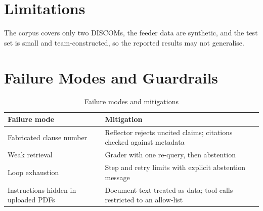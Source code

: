 \documentclass[12pt,a4paper,oneside]{report}
\newif\ifguidance
\newcommand{\guide}[1]{%
  \ifguidance
  \begin{tcolorbox}[enhanced,breakable,colback=guidebg,colframe=bmsblue,
    boxrule=0.6pt,arc=2pt,left=6pt,right=6pt,top=4pt,bottom=4pt,
    fonttitle=\bfseries\small,title={What to write here},
    before upper={\small\setstretch{1.1}}]
  #1
  \end{tcolorbox}
  \fi}
\newcommand{\dodont}[2]{%
  \ifguidance
  \begin{tcolorbox}[enhanced,breakable,sidebyside,sidebyside align=top seam,
    colback=dobg,colbacklower=dontbg,colframe=gray!60,boxrule=0.5pt,arc=2pt,
    lefthand ratio=0.5,left=5pt,right=5pt,top=4pt,bottom=4pt,
    fontupper=\small\setstretch{1.05},fontlower=\small\setstretch{1.05}]
  \textbf{\textcolor{ForestGreen}{\checkmark\ Do}}
  \begin{itemize}[leftmargin=12pt,itemsep=1pt,topsep=2pt]#1\end{itemize}
  \tcblower
  \textbf{\textcolor{BrickRed}{$\times$ Don't}}
  \begin{itemize}[leftmargin=12pt,itemsep=1pt,topsep=2pt]#2\end{itemize}
  \end{tcolorbox}
  \fi}
\newenvironment{sample}
  {\par\noindent{\footnotesize\bfseries\textcolor{BrickRed}{[SAMPLE --- replace with your own content]}}\par\color{samplecol}}
  {\par\medskip}
\begin{document}
\section{Limitations}
\guide{List the main limitations of data, method and evaluation.}
\dodont{\item Be specific and honest.
}
{\item Do not write ``the system has no major limitations''.
}
\begin{sample}
The corpus covers only two DISCOMs, the feeder data are synthetic, and the test set is small and
team-constructed, so the reported results may not generalise.
\end{sample}

\section{Failure Modes and Guardrails}
\guide{List the ways the agent can fail (hallucinated clause, wrong tool input, loop exhaustion, prompt
injection in documents) and the guardrail that addresses each.}
\dodont{\item Pair each failure mode with its mitigation.
}
{\item Do not list risks without mitigations.
}

\begin{sample}
\begin{table}[H]
\centering
\caption{Failure modes and mitigations}
\small
\begin{tabularx}{\linewidth}{@{}>{\raggedright\arraybackslash}X >{\raggedright\arraybackslash}X@{}}
\toprule
\textbf{Failure mode} & \textbf{Mitigation} \\ \midrule
Fabricated clause number & Reflector rejects uncited claims; citations checked against metadata \\
Weak retrieval & Grader with one re-query, then abstention \\
Loop exhaustion & Step and retry limits with explicit abstention message \\
Instructions hidden in uploaded PDFs & Document text treated as data; tool calls restricted to an allow-list \\
\bottomrule
\end{tabularx}
\end{table}
\end{sample}
\end{document}

